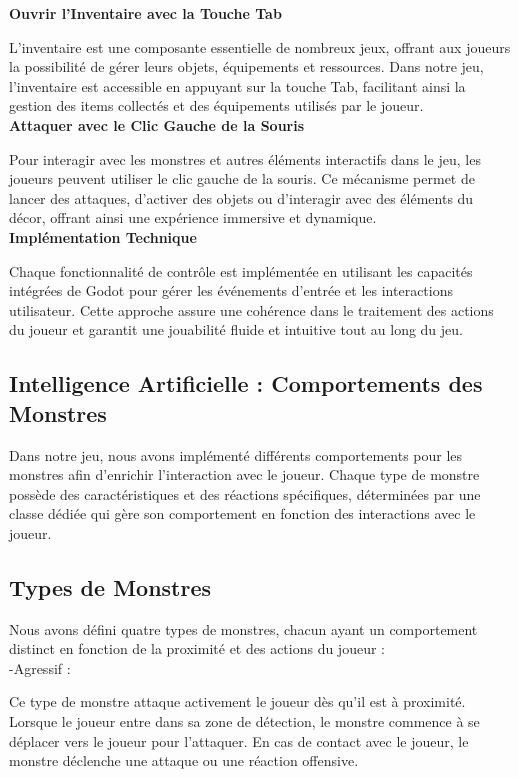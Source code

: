       \textbf{Ouvrir l'Inventaire avec la Touche Tab}

      L'inventaire est une composante essentielle de nombreux jeux, offrant aux joueurs la possibilité de gérer leurs objets, équipements et ressources. Dans notre jeu, l'inventaire est accessible en appuyant sur la touche Tab, facilitant ainsi la gestion des items collectés et des équipements utilisés par le joueur.
      \\

      \textbf{Attaquer avec le Clic Gauche de la Souris}

      Pour interagir avec les monstres et autres éléments interactifs dans le jeu, les joueurs peuvent utiliser le clic gauche de la souris. Ce mécanisme permet de lancer des attaques, d'activer des objets ou d'interagir avec des éléments du décor, offrant ainsi une expérience immersive et dynamique.
      \\

      \textbf{Implémentation Technique}

      Chaque fonctionnalité de contrôle est implémentée en utilisant les capacités intégrées de Godot pour gérer
      les événements d'entrée et les interactions utilisateur. Cette approche assure une cohérence dans le traitement des actions du joueur 
      et garantit une jouabilité fluide et intuitive tout au long du jeu.


      \subsection{Intelligence Artificielle : Comportements des Monstres}
      Dans notre jeu, nous avons implémenté différents comportements pour les monstres afin d'enrichir l'interaction avec le joueur. 
      Chaque type de monstre possède des caractéristiques et des réactions spécifiques, déterminées par une classe dédiée qui gère son comportement en
      fonction des interactions avec le joueur.

      \subsection*{Types de Monstres}

      Nous avons défini quatre types de monstres, chacun ayant un comportement distinct en fonction de la proximité et des actions du joueur :
      \\

      -Agressif :

      Ce type de monstre attaque activement le joueur dès qu'il est à proximité.
      Lorsque le joueur entre dans sa zone de détection, le monstre commence à se déplacer vers le joueur pour l'attaquer.
      En cas de contact avec le joueur, le monstre déclenche une attaque ou une réaction offensive.
      \\

